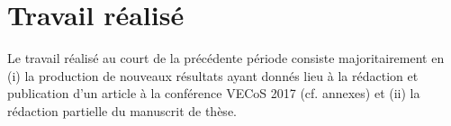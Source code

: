 \section{Travail réalisé}
\label{sec:done}

  Le travail réalisé au court de la précédente période consiste majoritairement
  en (i) la production de nouveaux résultats ayant donnés lieu à la rédaction
  et publication d'un article à la conférence VECoS 2017 (cf. annexes) et (ii)
  la rédaction partielle du manuscrit de thèse.


